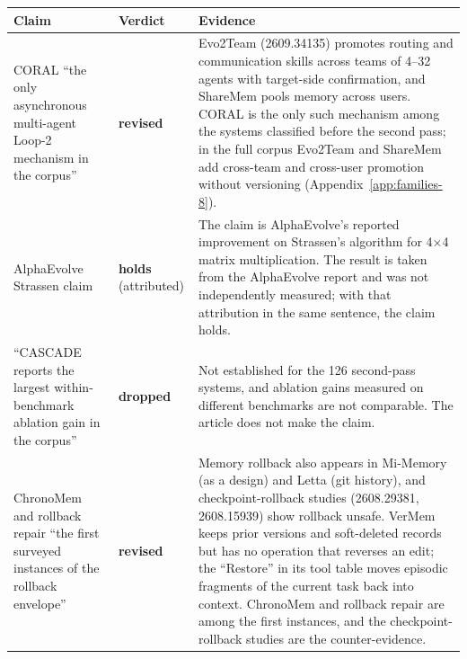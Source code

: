 \documentclass[
  11pt,
]{article}
\newcounter{none} %
\begin{document}
{\def\LTcaptype{none} %
\begin{longtable}[]{@{}
  >{\raggedright\arraybackslash}p{}
  >{\raggedright\arraybackslash}p{}
  >{\raggedright\arraybackslash}p{}@{}}
\toprule\noalign{}
\begin{minipage}[b]{\linewidth}\raggedright
Claim
\end{minipage} & \begin{minipage}[b]{\linewidth}\raggedright
Verdict
\end{minipage} & \begin{minipage}[b]{\linewidth}\raggedright
Evidence
\end{minipage} \\
\midrule\noalign{}
\endhead
\bottomrule\noalign{}
\endlastfoot
CORAL ``the only asynchronous multi-agent Loop-2 mechanism in the corpus'' & \textbf{revised} & Evo2Team (2609.34135) promotes routing and communication skills across teams of 4--32 agents with target-side confirmation, and ShareMem pools memory across users. CORAL is the only such mechanism among the systems classified before the second pass; in the full corpus Evo2Team and ShareMem add cross-team and cross-user promotion without versioning (Appendix~\ref{app:families-8}). \\
AlphaEvolve Strassen claim & \textbf{holds} (attributed) & The claim is AlphaEvolve's reported improvement on Strassen's algorithm for 4×4 matrix multiplication. The result is taken from the AlphaEvolve report and was not independently measured; with that attribution in the same sentence, the claim holds. \\
``CASCADE reports the largest within-benchmark ablation gain in the corpus'' & \textbf{dropped} & Not established for the 126 second-pass systems, and ablation gains measured on different benchmarks are not comparable. The article does not make the claim. \\
ChronoMem and rollback repair ``the first surveyed instances of the rollback envelope'' & \textbf{revised} & Memory rollback also appears in Mi-Memory (as a design) and Letta (git history), and checkpoint-rollback studies (2608.29381, 2608.15939) show rollback unsafe. VerMem keeps prior versions and soft-deleted records but has no operation that reverses an edit; the ``Restore'' in its tool table moves episodic fragments of the current task back into context. ChronoMem and rollback repair are among the first instances, and the checkpoint-rollback studies are the counter-evidence. \\

\end{longtable}}
\end{document}
